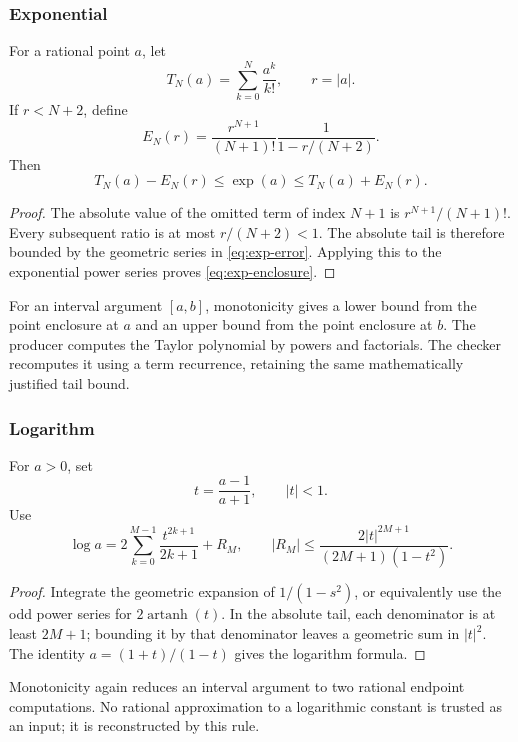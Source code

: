 \subsubsection{Exponential}
For a rational point \(a\), let
\[
 T_N(a)=\sum_{k=0}^N\frac{a^k}{k!},\qquad r=|a|.
\]
If \(r<N+2\), define
\begin{equation}\label{eq:exp-error}
 E_N(r)=\frac{r^{N+1}}{(N+1)!}
         \frac{1}{1-r/(N+2)}.
\end{equation}
Then
\begin{equation}\label{eq:exp-enclosure}
 T_N(a)-E_N(r)\le\exp(a)\le T_N(a)+E_N(r).
\end{equation}
\begin{proof}
The absolute value of the omitted term of index \(N+1\) is \(r^{N+1}/(N+1)!\). Every subsequent ratio is at most \(r/(N+2)<1\). The absolute tail is therefore bounded by the geometric series in \eqref{eq:exp-error}. Applying this to the exponential power series proves \eqref{eq:exp-enclosure}.
\end{proof}
For an interval argument \([a,b]\), monotonicity gives a lower bound from the point enclosure at \(a\) and an upper bound from the point enclosure at \(b\). The producer computes the Taylor polynomial by powers and factorials. The checker recomputes it using a term recurrence, retaining the same mathematically justified tail bound.

\subsubsection{Logarithm}
For \(a>0\), set
\[
 t=\frac{a-1}{a+1},\qquad |t|<1.
\]
Use
\begin{equation}\label{eq:log-series}
 \log a=2\sum_{k=0}^{M-1}\frac{t^{2k+1}}{2k+1}+R_M,
 \qquad
 |R_M|\le
 \frac{2|t|^{2M+1}}{(2M+1)(1-t^2)}.
\end{equation}
\begin{proof}
Integrate the geometric expansion of \(1/(1-s^2)\), or equivalently use the odd power series for \(2\operatorname{artanh}(t)\). In the absolute tail, each denominator is at least \(2M+1\); bounding it by that denominator leaves a geometric sum in \(|t|^2\). The identity \(a=(1+t)/(1-t)\) gives the logarithm formula.
\end{proof}
Monotonicity again reduces an interval argument to two rational endpoint computations. No rational approximation to a logarithmic constant is trusted as an input; it is reconstructed by this rule.

